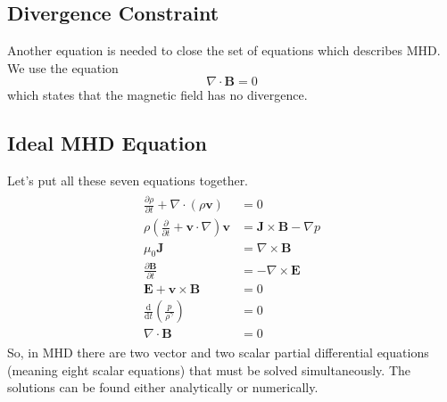 \documentclass[12pt]{article}
\newenvironment{changemargin}[2]{
\begin{list}{}{
\setlength{\topsep}{0pt}
\setlength{\leftmargin}{#1}
\setlength{\rightmargin}{#2}
\setlength{\listparindent}{\parindent}
\setlength{\itemindent}{\parindent}
\setlength{\parsep}{\parskip}
}
\item[]}{\end{list}}
\begin{document}
\begin{changemargin}{-2cm}{-2cm}
    \subsection{Divergence Constraint}
    Another equation is needed to close the set of equations which describes MHD. We use the equation
    \begin{equation}\label{eq:divergence}
        \nabla \cdot \mathbf {B} =0
    \end{equation}
    which states that the magnetic field has no divergence.

    \subsection{Ideal MHD Equation}
    Let's put all these seven equations together.
    \begin{align}\label{eq:mhd}
        \begin{split}
            \frac{\partial \rho}{\partial t}  +\nabla \cdot (\rho \mathbf{v})                            & = 0                                       \\
            \rho \left({\frac {\partial }{\partial t}}+\mathbf {v} \cdot \nabla \right)\mathbf {v} & =\mathbf {J} \times \mathbf {B} -\nabla p \\
            \mu _{0}\mathbf {J}                                                                    & =\nabla \times \mathbf {B}                \\
            {\frac {\partial \mathbf {B} }{\partial t}}                                            & =-\nabla \times \mathbf {E}               \\
            \mathbf {E} +\mathbf {v} \times \mathbf {B}                                            & =0                                        \\
            {\frac {\mathrm {d} }{\mathrm {d} t}}\left({\frac {p}{\rho ^{\gamma }}}\right)         & =0                                        \\
            \nabla \cdot \mathbf {B}                                                               & =0
        \end{split}
    \end{align}
    So, in MHD there are two vector and two scalar partial differential equations (meaning eight scalar equations) that must be solved simultaneously. The solutions can be found either analytically or numerically.


\end{changemargin}
\end{document}
